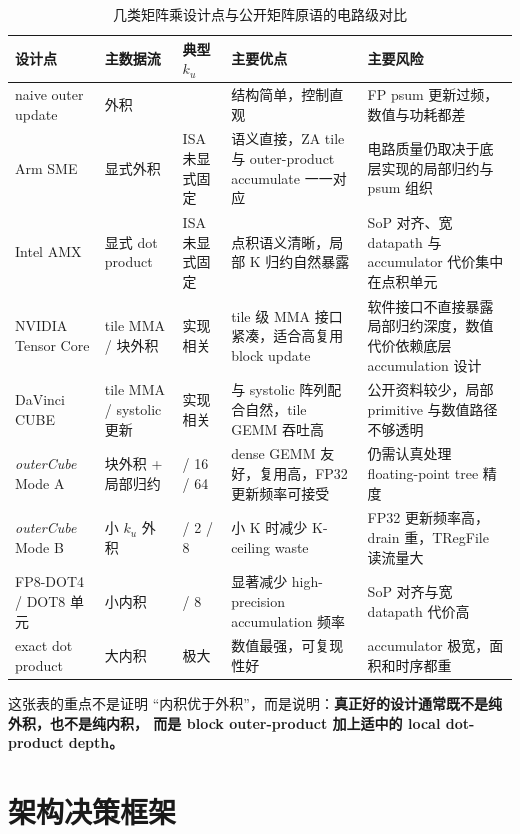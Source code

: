 \documentclass[UTF8,11pt,a4paper]{ctexart}
\newcommand{\ku}{\ensuremath{k_u}}
\newcommand{\modea}{Mode A}
\newcommand{\modeb}{Mode B}
\newcommand{\outercube}{\textit{outerCube}}
\begin{document}
\begin{table}[H]
  \centering
  \caption{几类矩阵乘设计点与公开矩阵原语的电路级对比}
  \label{tab:compare}
  \begin{tabularx}{\textwidth}{>{\raggedright\arraybackslash}p{2.5cm} >{\raggedright\arraybackslash}p{2.3cm} >{\raggedright\arraybackslash}p{1.45cm} >{\raggedright\arraybackslash}X >{\raggedright\arraybackslash}X}
    \toprule
    设计点 & 主数据流 & 典型 $\ku$ & 主要优点 & 主要风险 \\
    \midrule
    naive outer update & 外积 & 1 & 结构简单，控制直观 & FP psum 更新过频，数值与功耗都差 \\
    Arm SME & 显式外积 & ISA 未显式固定 & 语义直接，ZA tile 与 outer-product accumulate 一一对应 & 电路质量仍取决于底层实现的局部归约与 psum 组织 \\
    Intel AMX & 显式 dot product & ISA 未显式固定 & 点积语义清晰，局部 K 归约自然暴露 & SoP 对齐、宽 datapath 与 accumulator 代价集中在点积单元 \\
    NVIDIA Tensor Core & tile MMA / 块外积 & 实现相关 & tile 级 MMA 接口紧凑，适合高复用 block update & 软件接口不直接暴露局部归约深度，数值代价依赖底层 accumulation 设计 \\
    DaVinci CUBE & tile MMA / systolic 更新 & 实现相关 & 与 systolic 阵列配合自然，tile GEMM 吞吐高 & 公开资料较少，局部 primitive 与数值路径不够透明 \\
    \outercube{} \modea{} & 块外积 + 局部归约 & 8 / 16 / 64 & dense GEMM 友好，复用高，FP32 更新频率可接受 & 仍需认真处理 floating-point tree 精度 \\
    \outercube{} \modeb{} & 小 $\ku$ 外积 & 1 / 2 / 8 & 小 K 时减少 K-ceiling waste & FP32 更新频率高，drain 重，TRegFile 读流量大 \\
    FP8-DOT4 / DOT8 单元 & 小内积 & 4 / 8 & 显著减少 high-precision accumulation 频率 & SoP 对齐与宽 datapath 代价高 \\
    exact dot product & 大内积 & 极大 & 数值最强，可复现性好 & accumulator 极宽，面积和时序都重 \\
    \bottomrule
  \end{tabularx}
\end{table}

这张表的重点不是证明 ``内积优于外积''，而是说明：\textbf{真正好的设计通常既不是纯外积，也不是纯内积，
而是 block outer-product 加上适中的 local dot-product depth。}

\section{架构决策框架}
\end{document}
